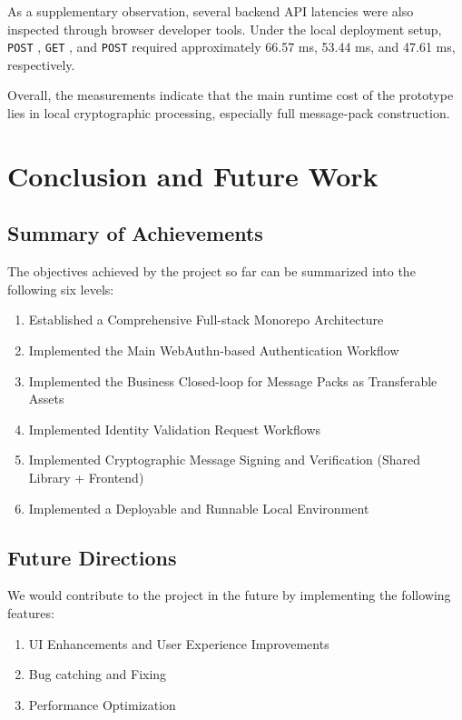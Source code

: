 \documentclass[letterpaper,11pt]{article}
\begin{document}
As a supplementary observation, several backend API latencies were also inspected through browser developer tools. Under the local deployment setup, \texttt{POST} , \texttt{GET} , and \texttt{POST}  required approximately 66.57 ms, 53.44 ms, and 47.61 ms, respectively.

Overall, the measurements indicate that the main runtime cost of the prototype lies in local cryptographic processing, especially full message-pack construction.

\section{Conclusion and Future Work}

\subsection{Summary of Achievements}

The objectives achieved by the project so far can be summarized into the following six levels:

\begin{enumerate}[leftmargin=2em]
    \item Established a Comprehensive Full-stack Monorepo Architecture
    \item Implemented the Main WebAuthn-based Authentication Workflow
    \item Implemented the Business Closed-loop for Message Packs as Transferable Assets
    \item Implemented Identity Validation Request Workflows
    \item Implemented Cryptographic Message Signing and Verification (Shared Library + Frontend)
    \item Implemented a Deployable and Runnable Local Environment
\end{enumerate}

\subsection{Future Directions}

We would contribute to the project in the future by implementing the following features:

\begin{enumerate}[leftmargin=2em]
    \item UI Enhancements and User Experience Improvements
    \item Bug catching and Fixing
    \item Performance Optimization
\end{enumerate}
\end{document}
